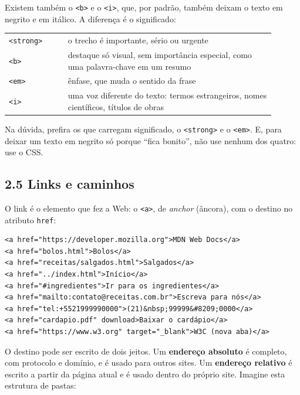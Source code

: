 Existem também o \texttt{<b>} e o \texttt{<i>}, que, por padrão, também deixam o texto em negrito e em itálico. A diferença é o significado:

\begin{center}
\begin{tabular}{@{}P{0.2\linewidth}P{0.7\linewidth}@{}}
\toprule
{}
 &  \\
\midrule
\texttt{<strong>} & o trecho é importante, sério ou urgente \\
 \texttt{<b>} & destaque só visual, sem importância especial, como uma palavra-chave em um resumo \\
\texttt{<em>} & ênfase, que muda o sentido da frase \\
 \texttt{<i>} & uma voz diferente do texto: termos estrangeiros, nomes científicos, títulos de obras \\
\bottomrule
\end{tabular}
\end{center}

Na dúvida, prefira os que carregam significado, o \texttt{<strong>} e o \texttt{<em>}. E, para deixar um texto em negrito só porque ``fica bonito'', não use nenhum dos quatro: use o CSS.

\subsection{2.5 Links e caminhos}

O link é o elemento que fez a Web: o \texttt{<a>}, de \textit{anchor} (âncora), com o destino no atributo \texttt{href}:

\begin{codigo}
\begin{Verbatim}[breaklines=true, breaksymbolleft={}, fontsize=\footnotesize]
<a href="https://developer.mozilla.org">MDN Web Docs</a>
<a href="bolos.html">Bolos</a>
<a href="receitas/salgados.html">Salgados</a>
<a href="../index.html">Início</a>
<a href="#ingredientes">Ir para os ingredientes</a>
<a href="mailto:contato@receitas.com.br">Escreva para nós</a>
<a href="tel:+5521999990000">(21)&nbsp;99999&#8209;0000</a>
<a href="cardapio.pdf" download>Baixar o cardápio</a>
<a href="https://www.w3.org" target="_blank">W3C (nova aba)</a>
\end{Verbatim}
\end{codigo}

O destino pode ser escrito de dois jeitos. Um \textbf{endereço absoluto} é completo, com protocolo e domínio, e é usado para outros sites. Um \textbf{endereço relativo} é escrito a partir da página atual e é usado dentro do próprio site. Imagine esta estrutura de pastas:

